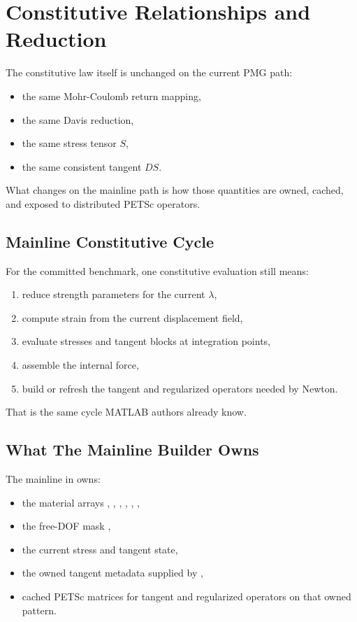\chapter{Constitutive Relationships and Reduction}

The constitutive law itself is unchanged on the current PMG path:
\begin{itemize}
\item the same Mohr-Coulomb return mapping,
\item the same Davis reduction,
\item the same stress tensor \(S\),
\item the same consistent tangent \(DS\).
\end{itemize}

What changes on the mainline path is how those quantities are owned, cached,
and exposed to distributed PETSc operators.

\section{Mainline Constitutive Cycle}

For the committed benchmark, one constitutive evaluation still means:
\begin{enumerate}
\item reduce strength parameters for the current \(\lambda\),
\item compute strain from the current displacement field,
\item evaluate stresses and tangent blocks at integration points,
\item assemble the internal force,
\item build or refresh the tangent and regularized operators needed by Newton.
\end{enumerate}

That is the same cycle MATLAB authors already know.

\section{What The Mainline Builder Owns}

The mainline  in
 owns:
\begin{itemize}
\item the material arrays , , , ,
, ,
\item the free-DOF mask ,
\item the current stress and tangent state,
\item the owned tangent metadata supplied by
,
\item cached PETSc matrices for tangent and regularized operators on that owned
pattern.
\end{itemize}

